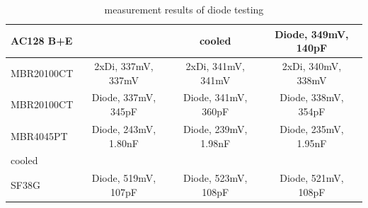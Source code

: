 \begin{table}[H]
\begin{center}
\begin{tabular}{| l | c | c | c |}
    \hline
AC128 B+E  &                      &    cooled          & Diode, 349mV, 140pF  \\
    \hline
MBR20100CT & 2xDi, 337mV, 337mV    & 2xDi, 341mV, 341mV  & 2xDi, 340mV, 338mV  \\
    \hline
MBR20100CT & Diode, 337mV, 345pF  & Diode, 341mV, 360pF & Diode, 338mV, 354pF\\
    \hline
MBR4045PT  & Diode, 243mV, 1.80nF & Diode, 239mV, 1.98nF & Diode, 235mV, 1.95nF\\
cooled    &                      &                     &                   \\
    \hline
SF38G      & Diode, 519mV, 107pF  & Diode, 523mV, 108pF & Diode, 521mV, 108pF\\
    \hline
    \end{tabular}
  \end{center}
  \caption{measurement results of diode testing}
  \label{tab:diodes} 
\end{table}


